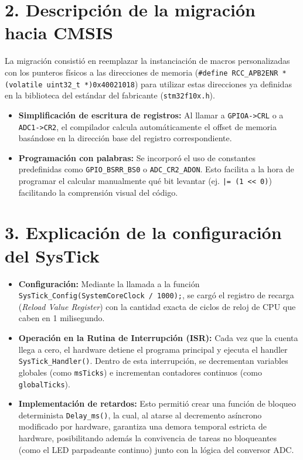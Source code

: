 \section*{2. Descripción de la migración hacia CMSIS}
La migración consistió en reemplazar la instanciación de macros personalizadas con los punteros físicos a las direcciones de memoria (\texttt{\#define RCC\_APB2ENR *(volatile uint32\_t *)0x40021018}) para utilizar estas direcciones ya definidas en la biblioteca del estándar del fabricante (\texttt{stm32f10x.h}).

\begin{itemize}
    \item \textbf{Simplificación de escritura de registros:} Al llamar a \texttt{GPIOA->CRL} o a \texttt{ADC1->CR2}, el compilador calcula automáticamente el offset de memoria basándose en la dirección base del registro correspondiente.
    \item \textbf{Programación con palabras:} Se incorporó el uso de constantes predefinidas como \texttt{GPIO\_BSRR\_BS0} o \texttt{ADC\_CR2\_ADON}. Esto facilita a la hora de programar el calcular manualmente qué bit levantar (ej. \texttt{|= (1 \textless\textless\ 0)}) facilitando la comprensión visual del código.
\end{itemize}

\section*{3. Explicación de la configuración del SysTick}


\begin{itemize}
    \item \textbf{Configuración:} Mediante la llamada a la función \texttt{SysTick\_Config(SystemCoreClock / 1000);}, se cargó el registro de recarga (\textit{Reload Value Register}) con la cantidad exacta de ciclos de reloj de CPU que caben en 1 milisegundo.
    \item \textbf{Operación en la Rutina de Interrupción (ISR):} Cada vez que la cuenta llega a cero, el hardware detiene el programa principal y ejecuta el handler \texttt{SysTick\_Handler()}. Dentro de esta interrupción, se decrementan variables globales (como \texttt{msTicks}) e incrementan contadores continuos (como \texttt{globalTicks}).
    \item \textbf{Implementación de retardos:} Esto permitió crear una función de bloqueo determinista \texttt{Delay\_ms()}, la cual, al atarse al decremento asíncrono modificado por hardware, garantiza una demora temporal estricta de hardware, posibilitando además la convivencia de tareas no bloqueantes (como el LED parpadeante continuo) junto con la lógica del conversor ADC.
\end{itemize}

